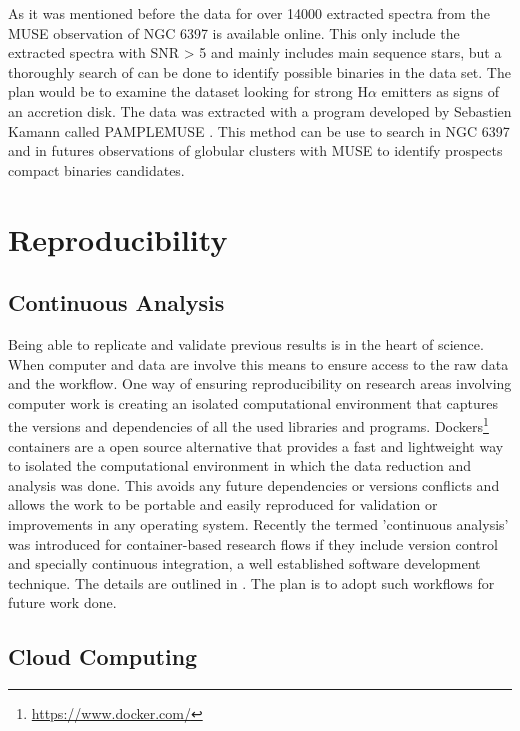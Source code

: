 As it was mentioned before the data for over 14000 extracted spectra from the MUSE observation of NGC 6397 is available online. This only include the extracted spectra with SNR > 5 and mainly includes main sequence stars, but a thoroughly search of can be done to identify possible binaries in the data set. The plan would be to examine the dataset looking for strong H$\alpha$ emitters as signs of an accretion disk. The data was extracted with a program developed by Sebastien Kamann called PAMPLEMUSE \citep{2013A&A...549A..71K}. This method can be use  to search in NGC 6397 and in futures observations of globular clusters with MUSE to identify prospects compact binaries candidates. 


\section{Reproducibility}


\subsection{Continuous Analysis}


Being able to replicate and validate previous results is in the heart of science. When computer and data are involve this means to ensure access to the raw data and the workflow. One way of ensuring reproducibility on research areas involving computer work is creating an isolated computational environment that captures the versions and dependencies of all the used libraries and programs. Dockers\footnote{\url{https://www.docker.com/}} containers are a open source alternative that provides a fast and lightweight way to isolated the computational environment in which the data reduction and analysis was done. This  avoids any future dependencies or versions conflicts and allows the work to be portable and easily reproduced for validation or improvements in any operating system. Recently the termed 'continuous analysis' was introduced for container-based research flows if they include version control and specially continuous integration, a well established software development technique. The details are outlined in \cite{Beaulieu-Jones056473}. The plan is to adopt such workflows for future work done.   

\subsection{Cloud Computing}

